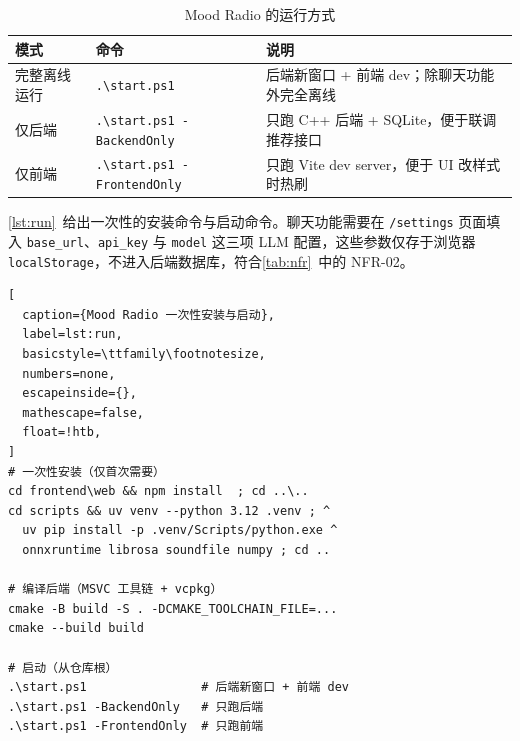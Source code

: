 \begin{table}[!htb]
  \centering
  \caption{Mood Radio 的运行方式}\label{tab:run-mode}
  \begin{tabularx}{\linewidth}{lXX}
    \toprule
    \textbf{模式} & \textbf{命令} & \textbf{说明} \\
    \midrule
    完整离线运行 & \texttt{.{\textbackslash}start.ps1} & 后端新窗口 + 前端 dev；除聊天功能外完全离线 \\
    仅后端       & \texttt{.{\textbackslash}start.ps1 -BackendOnly}  & 只跑 C++ 后端 + SQLite，便于联调推荐接口 \\
    仅前端       & \texttt{.{\textbackslash}start.ps1 -FrontendOnly} & 只跑 Vite dev server，便于 UI 改样式时热刷 \\
    \bottomrule
  \end{tabularx}
\end{table}

\cref{lst:run}~给出一次性的安装命令与启动命令。聊天功能需要在 \texttt{/settings} 页面填入 \texttt{base\_url}、\texttt{api\_key} 与 \texttt{model} 这三项 LLM 配置，这些参数仅存于浏览器 \texttt{localStorage}，不进入后端数据库，符合\cref{tab:nfr}~中的 NFR-02。

\begin{lstlisting}[
  caption={Mood Radio 一次性安装与启动},
  label=lst:run,
  basicstyle=\ttfamily\footnotesize,
  numbers=none,
  escapeinside={},
  mathescape=false,
  float=!htb,
]
# 一次性安装（仅首次需要）
cd frontend\web && npm install  ; cd ..\..
cd scripts && uv venv --python 3.12 .venv ; ^
  uv pip install -p .venv/Scripts/python.exe ^
  onnxruntime librosa soundfile numpy ; cd ..

# 编译后端（MSVC 工具链 + vcpkg）
cmake -B build -S . -DCMAKE_TOOLCHAIN_FILE=...
cmake --build build

# 启动（从仓库根）
.\start.ps1                # 后端新窗口 + 前端 dev
.\start.ps1 -BackendOnly   # 只跑后端
.\start.ps1 -FrontendOnly  # 只跑前端
\end{lstlisting}
